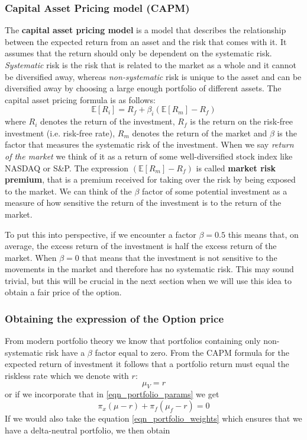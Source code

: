 \documentclass[times, utf8, diplomski]{fer}
\begin{document}
\subsubsection{Capital Asset Pricing model (CAPM)} %
The \textbf{capital asset pricing model} is a model that describes the relationship between the expected return from an asset and the risk that comes with it. It assumes that the return should only be dependent on the systematic risk. \textit{Systematic} risk is the risk that is related to the market as a whole and it cannot be diversified away, whereas \textit{non-systematic} risk is unique to the asset and can be diversified away by choosing a large enough portfolio of different assets. The capital asset pricing formula is as follows:
\begin{equation} \label{eqn_capm}
	\mathbb{E}[R_i] = R_f + \beta_i (\mathbb{E}[R_m] - R_f)
\end{equation}
where $R_i$ denotes the return of the investment, $R_f$ is the return on the risk-free investment (i.e. risk-free rate), $R_m$ denotes the return of the market and $\beta$ is the factor that measures the systematic risk of the investment. When we say \textit{return of the market} we think of it as a return of some well-diversified stock index like NASDAQ or S\&P. The expression $(\mathbb{E}[R_m] - R_f)$ is called \textbf{market risk premium}, that is a premium received for taking over the risk by being exposed to the market. We can think of the $\beta$ factor of some potential investment as a measure of how sensitive the return of the investment is to the return of the market. 

\noindent To put this into perspective, if we encounter a factor $\beta = 0.5$ this means that, on average, the excess return of the investment is half the excess return of the market. When $\beta = 0$ that means that the investment is not sensitive to the movements in the market and therefore has no systematic risk. This may sound trivial, but this will be crucial in the next section when we will use this idea to obtain a fair price of the option.

\subsubsection{Obtaining the expression of the Option price}
From modern portfolio theory we know that portfolios containing only non-systematic risk have a $\beta$ factor equal to zero. From the CAPM formula for the expected return of investment it follows that a portfolio return must equal the riskless rate which we denote with $r$: $$ \mu_V = r $$ or if we incorporate that in \ref{eqn_portfolio_params} we get
\begin{equation} \label{eqn_comb_1}
	\pi_x(\mu - r) + \pi_f(\mu_f - r) = 0
\end{equation}
If we would also take the equation \ref{eqn_portfolio_weights} which ensures that we have a delta-neutral portfolio, we then obtain
\end{document}
